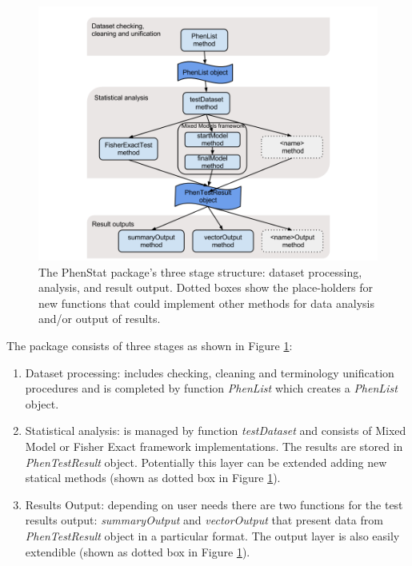 \documentclass[12pt,a4paper]{article}
\begin{document}
\begin{figure}[!htpb]%
\centerline{\includegraphics[scale=0.5]{PhenStat.png}}
\caption{The PhenStat package's three stage structure: dataset processing, analysis, and result output. Dotted boxes show the place-holders for new functions that could implement other methods for data analysis and/or output of results.}\label{fig:01}
\end{figure}

The package consists of three stages as shown in Figure \ref{fig:01}:
\begin{enumerate}
\item Dataset processing: includes checking, cleaning and terminology unification procedures and is completed by function \textit{PhenList} which creates a \textit{PhenList} object. 
\item Statistical analysis: is managed by function \textit{testDataset} and consists of Mixed Model or Fisher Exact framework implementations. The results are stored in \textit{PhenTestResult} object. 
Potentially this layer can be extended adding new statical methods (shown as dotted box in Figure \ref{fig:01}). 
\item Results Output: depending on user needs there are two functions for the test results output: \textit{summaryOutput} 
and \textit{vectorOutput} that present data from \textit{PhenTestResult} object in a particular format. The output layer is also easily extendible (shown as dotted box in Figure \ref{fig:01}).
\end{enumerate}
\end{document}
